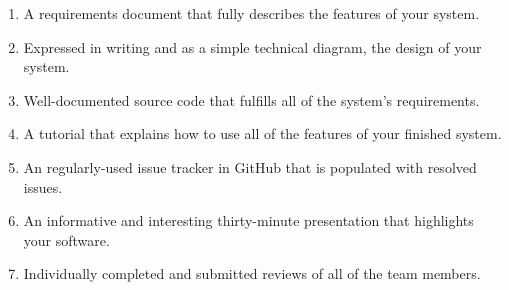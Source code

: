 \vspace*{-.1in}
\begin{enumerate}
  \setlength{\itemsep}{0in}
  \item A requirements document that fully describes the features of your system.
  \item Expressed in writing and as a simple technical diagram, the design of your system.
  \item Well-documented source code that fulfills all of the system's requirements.
  \item A tutorial that explains how to use all of the features of your finished system.
  \item An regularly-used issue tracker in GitHub that is populated with resolved issues.
  \item An informative and interesting thirty-minute presentation that highlights your software.
  \item Individually completed and submitted reviews of all of the team members.
\end{enumerate}
\vspace*{-.1in}



